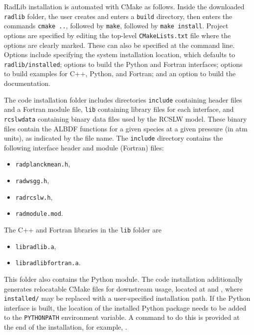 \documentclass[preprint,12pt]{elsarticle}
\begin{document}
RadLib installation is automated with CMake as follows. Inside the downloaded \texttt{radlib} folder, the user creates and enters a \texttt{build} directory, then enters the commands \texttt{cmake ..}, followed by \texttt{make}, followed by \texttt{make install}. Project options are specified by editing the top-level \texttt{CMakeLists.txt} file where the options are clearly marked. These can also be specified at the command line. Options include specifying the system installation location, which defaults to \texttt{radlib/installed}; options to build the Python and Fortran interfaces; options to build examples for C++, Python, and Fortran; and an option to build the documentation. 

The code installation folder includes directories \texttt{include} containing header files and a Fortran module file, 
\texttt{lib} containing library files for each interface, and \texttt{rcslw\textunderscore data} containing binary data files used by the RCSLW model. These binary files contain the ALBDF functions for a given species at a given pressure (in atm units), as indicated by the file name. The \texttt{include} directory contains the following interface header and module (Fortran) files:
%
\begin{itemize}
    \item \texttt{rad\textunderscore planck\textunderscore mean.h},
    \item \texttt{rad\textunderscore wsgg.h},
    \item \texttt{rad\textunderscore rcslw.h},
    \item \texttt{rad\textunderscore module.mod}.
\end{itemize}
%
The C++ and Fortran libraries in the \texttt{lib} folder are
\begin{itemize}
    \item \texttt{libradlib.a},
    \item \texttt{libradlib\textunderscore fortran.a}.
\end{itemize}
%
This folder also contains the Python module.
The code installation additionally generates relocatable CMake files for downstream usage, located at \texttt{} and \texttt{}, where \texttt{installed/} may be replaced with a user-specified installation path. If the Python interface is built, the location of the installed Python package needs to be added to the \texttt{PYTHONPATH} environment variable. A command to do this is provided at the end of the installation, for example, \texttt{}.
\end{document}
